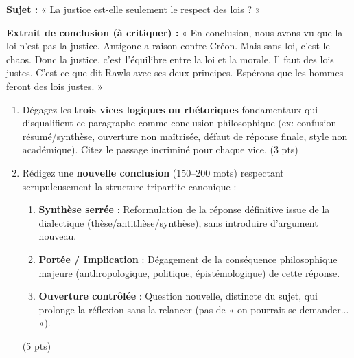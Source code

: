 \documentclass[11pt]{article}
\begin{document}
\begin{exercice}
\textbf{Sujet :} « La justice est-elle seulement le respect des lois ? »

\textbf{Extrait de conclusion (à critiquer) :}
« En conclusion, nous avons vu que la loi n'est pas la justice. Antigone a raison contre Créon. Mais sans loi, c'est le chaos. Donc la justice, c'est l'équilibre entre la loi et la morale. Il faut des lois justes. C'est ce que dit Rawls avec ses deux principes. Espérons que les hommes feront des lois justes. »

\begin{enumerate}
    \item Dégagez les \textbf{trois vices logiques ou rhétoriques} fondamentaux qui disqualifient ce paragraphe comme conclusion philosophique (ex: confusion résumé/synthèse, ouverture non maîtrisée, défaut de réponse finale, style non académique). Citez le passage incriminé pour chaque vice. (3 pts)
    \item Rédigez une \textbf{nouvelle conclusion} (150--200 mots) respectant scrupuleusement la structure tripartite canonique :
    \begin{enumerate}
        \item \textbf{Synthèse serrée} : Reformulation de la réponse définitive issue de la dialectique (thèse/antithèse/synthèse), sans introduire d'argument nouveau.
        \item \textbf{Portée / Implication} : Dégagement de la conséquence philosophique majeure (anthropologique, politique, épistémologique) de cette réponse.
        \item \textbf{Ouverture contrôlée} : Question nouvelle, distincte du sujet, qui prolonge la réflexion sans la relancer (pas de « on pourrait se demander... »).
    \end{enumerate}
    (5 pts)
\end{enumerate}
\end{exercice}
\end{document}
